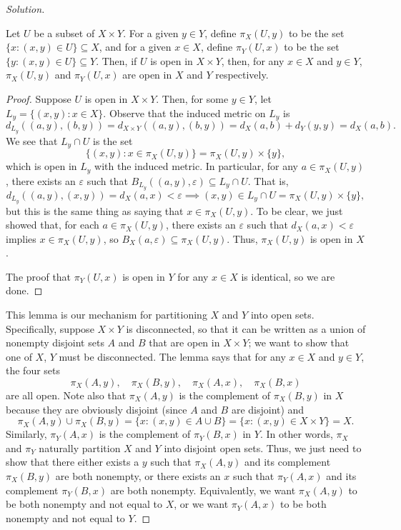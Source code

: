 \documentclass[11pt]{scrartcl}
\providecommand{\eps}{\varepsilon}
\newenvironment{soln}{\begin{proof}[Solution]}{\end{proof}}
\begin{document}
\begin{soln}
	\begin{lemma}
		Let $U$ be a subset of $X\times Y$.
		For a given $y\in Y$,
		define $\pi_X(U, y)$ to be the set $\{x : (x, y)\in U\}\subseteq X$, and
		for a given $x\in X$,
		define $\pi_Y(U, x)$ to be the set $\{y : (x, y)\in U\}\subseteq Y$.
		Then, if $U$ is open in $X\times Y$,
		then, for any $x\in X$ and $y\in Y$,
		$\pi_X(U, y)$ and $\pi_Y(U, x)$ are open
		in $X$ and $Y$ respectively.
	\end{lemma}
	\begin{proof}
		Suppose $U$ is open in $X\times Y$.
		Then, for some $y\in Y$, let $L_y = \{(x, y) : x\in X\}$.
		Observe that the induced metric on $L_y$ is
		\[d_{L_y}((a, y), (b, y)) = d_{X\times Y}((a,y), (b,y)) =
		d_X(a, b) + d_Y(y, y) = d_X(a, b).\]
		We see that $L_y\cap U$ is the set
		\[\{(x, y) : x\in \pi_X(U, y)\} = \pi_X(U, y)\times\{y\},\]
		which is open in $L_y$ with the induced metric.
		In particular, for any $a\in \pi_X(U, y)$,
		there exists an $\eps$ such that
		$B_{L_y}((a,y), \eps)\subseteq L_y\cap U$. That is,
		\[d_{L_y}((a, y), (x, y)) = d_X(a, x) < \eps \implies
		(x, y)\in L_y\cap U = \pi_X(U, y)\times\{y\},\]
		but this is the same thing as saying that $x\in \pi_X(U, y)$.
		To be clear, we just showed that, for each $a\in\pi_X(U, y)$,
		there exists an $\eps$ such that
		$d_X(a, x) < \eps$ implies $x\in \pi_X(U, y)$,
		so $B_X(a, \eps)\subseteq \pi_X(U, y)$.
		Thus, $\pi_X(U, y)$ is open in $X$.
		
		The proof that $\pi_Y(U, x)$ is open in $Y$ for any $x\in X$
		is identical, so we are done.
	\end{proof}

	This lemma is our mechanism for partitioning $X$ and $Y$ into open sets.
	Specifically, suppose $X\times Y$ is disconnected,
	so that it can be written as a union of nonempty disjoint sets $A$ and $B$
	that are open in $X\times Y$;
	we want to show that one of $X$, $Y$ must be disconnected.
	The lemma says that for any $x\in X$ and $y\in Y$, the four sets
	\[\pi_X(A, y),\quad \pi_X(B, y),\quad\pi_X(A, x),\quad \pi_X(B, x)\]
	are all open.
	Note also that $\pi_X(A, y)$ is the complement of $\pi_X(B, y)$ in $X$ 
	because they are obviously disjoint (since $A$ and $B$ are disjoint) and
	\[\pi_X(A, y)\cup \pi_X(B, y) = \{x : (x, y)\in A\cup B\}
	= \{x : (x, y)\in X\times Y\} = X.\]
	Similarly, $\pi_Y(A, x)$ is the complement of $\pi_Y(B, x)$ in $Y$.
	In other words, $\pi_X$ and $\pi_Y$ naturally partition $X$ and $Y$
	into disjoint open sets.
	Thus, we just need to show that there either exists a $y$ such that
	$\pi_X(A, y)$ and its complement $\pi_X(B, y)$ are both nonempty, or
	there exists an $x$ such that
	$\pi_Y(A, x)$ and its complement $\pi_Y(B, x)$ are both nonempty.
	Equivalently,
	we want $\pi_X(A, y)$ to be both nonempty and not equal to $X$,
	or we want $\pi_Y(A, x)$ to be both nonempty and not equal to $Y$.
	

\end{soln}
\end{document}
